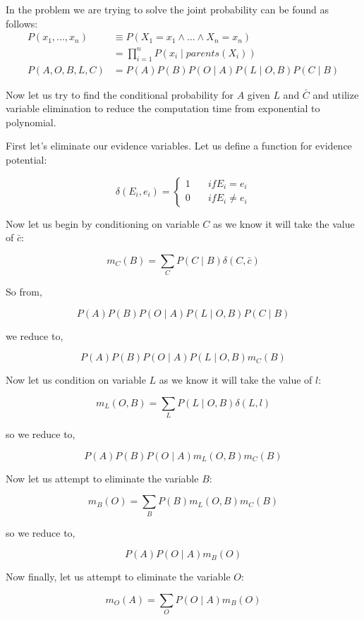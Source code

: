\documentclass[11pt]{article}
\begin{document}
In the problem we are trying to solve the joint probability can be found
as follows: \[
\begin{align}
P(x_1,...,x_n) &\equiv P(X_1=x_1 \land ... \land X_n = x_n) \\
               & = \prod_{i=1}^n P(x_i \; |\; parents(X_i) ) \\
P(A,O,B,L,C)   & = P(A)P(B)P(O \; | \; A)P(L\; |\; O,B)P(C\; |\; B) 
\end{align}
\]

Now let us try to find the conditional probability for \(A\) given \(L\)
and \(\bar{C}\) and utilize variable elimination to reduce the
computation time from exponential to polynomial.

First let's eliminate our evidence variables. Let us define a function
for evidence potential:

\[
\delta(E_i,e_i) = \left\{
                    \begin{array}{ll}
                        1 & \quad if E_i=e_i \\
                        0 & \quad if E_i \neq e_i
                    \end{array}
                 \right.
\]

Now let us begin by conditioning on variable \(C\) as we know it will
take the value of \(\bar{c}\):

\[
m_{C}(B) = \sum_{C}P(C\; |\; B)\delta(C,\bar{c})
\]

So from,

\[
P(A)P(B)P(O \; | \; A)P(L\; |\; O,B)P(C\; |\; B)
\]

we reduce to,

\[
P(A)P(B)P(O \; | \; A)P(L\; |\; O,B)m_{C}(B)
\]

Now let us condition on variable \(L\) as we know it will take the value
of \(l\):

\[
m_{L}(O,B) = \sum_L P(L\; |\; O,B)\delta(L, l)
\]

so we reduce to,

\[
P(A)P(B)P(O \; | \; A)m_{L}(O,B)m_{C}(B)
\]

Now let us attempt to eliminate the variable \(B\):

\[
m_B(O) = \sum_{B}P(B)m_L(O,B)m_C(B)
\]

so we reduce to,

\[
P(A)P(O \; | \; A)m_B(O)
\]

Now finally, let us attempt to eliminate the variable \(O\):

\[
m_O(A) = \sum_O P(O \; | \; A)m_B(O)
\]
\end{document}
